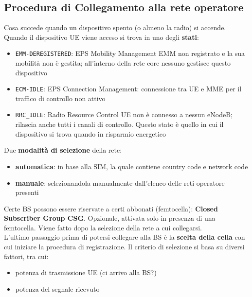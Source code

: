 
\newpage

\subsection{Procedura di Collegamento alla rete operatore}

Cosa succede quando un dispositivo spento (o almeno la radio) si accende. Quando il dispositivo UE viene acceso si trova in uno degli \textbf{stati}: 
\begin{itemize}
	\item \texttt{EMM-DEREGISTERED}: EPS Mobility Management EMM non registrato e la sua mobilità non è gestita; all'interno della rete core nessuno gestisce questo dispositivo
	\item \texttt{ECM-IDLE}: EPS Connection Management: connessione tra UE e MME per il traffico di controllo non attivo
	\item \texttt{RRC\_IDLE}: Radio Resource Control UE non è connesso a nessun eNodeB; rilascia anche tutti i canali di controllo. Questo stato è quello in cui il dispositivo si trova quando in risparmio energetico
\end{itemize}

Due \textbf{modalità di selezione} della rete: 
\begin{itemize}
	\item \textbf{automatica}: in base alla SIM, la quale contiene country code e network code
	\item \textbf{manuale}: selezionandola manualmente dall'elenco delle reti operatore presenti
\end{itemize}

Certe BS possono essere riservate a certi abbonati (femtocella): \textbf{Closed Subscriber Group CSG}. Opzionale, attivata solo in presenza di una femtocella. Viene fatto dopo la selezione della rete a cui collegarsi.\\

L'ultimo passaggio prima di potersi collegare alla BS è la \textbf{scelta della cella} con cui iniziare la procedura di registrazione. Il criterio di selezione si basa su diversi fattori, tra cui: 
\begin{itemize}
	\item potenza di trasmissione UE (ci arrivo alla BS?)
	\item potenza del segnale ricevuto
\end{itemize}


